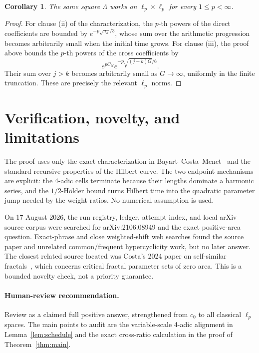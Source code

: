 \documentclass[11pt]{article}
\newtheorem{corollary}[theorem]{Corollary}
\begin{document}
\begin{corollary}
The same square \(\Lambda\) works on
\(\ell_p\times\ell_p\) for every \(1\leq p<\infty\).
\end{corollary}

\begin{proof}
For clause (ii) of the characterization, the \(p\)-th powers of the direct
coefficients are bounded by
\(e^{-p\sqrt{n_h}/3}\), whose sum over the arithmetic progression becomes
arbitrarily small when the initial time grows.  For clause (iii), the proof
above bounds the \(p\)-th powers of the cross coefficients by
\[
 e^{pC_N}e^{-p\sqrt{(j-k)G}/6}.
\]
Their sum over \(j>k\) becomes arbitrarily small as \(G\to\infty\), uniformly
in the finite truncation.  These are precisely the relevant \(\ell_p\) norms.
\end{proof}

\section*{Verification, novelty, and limitations}

The proof uses only the exact characterization in
Bayart--Costa--Menet~\cite{BayartCostaMenet} and the standard recursive
properties of the Hilbert curve.  The two endpoint mechanisms are explicit:
the 4-adic cells terminate because their lengths dominate a harmonic series,
and the \(1/2\)-Hölder bound turns Hilbert time into the quadratic parameter
jump needed by the weight ratios.  No numerical assumption is used.

On 17 August 2026, the run registry, ledger, attempt index, and local arXiv
source corpus were searched for arXiv:2106.08949 and the exact positive-area
question.  Exact-phrase and close weighted-shift web searches found the
source paper and unrelated common/frequent hypercyclicity work, but no later
answer.  The closest related source located was Costa's 2024 paper on
self-similar fractals~\cite{CostaFractals}, which concerns critical fractal
parameter sets of zero area.  This is a bounded novelty check, not a priority
guarantee.

\paragraph{Human-review recommendation.}
Review as a claimed full positive answer, strengthened from \(c_0\) to all
classical \(\ell_p\) spaces.  The main points to audit are the variable-scale
4-adic alignment in Lemma~\ref{lem:schedule} and the exact cross-ratio
calculation in the proof of Theorem~\ref{thm:main}.
\end{document}
